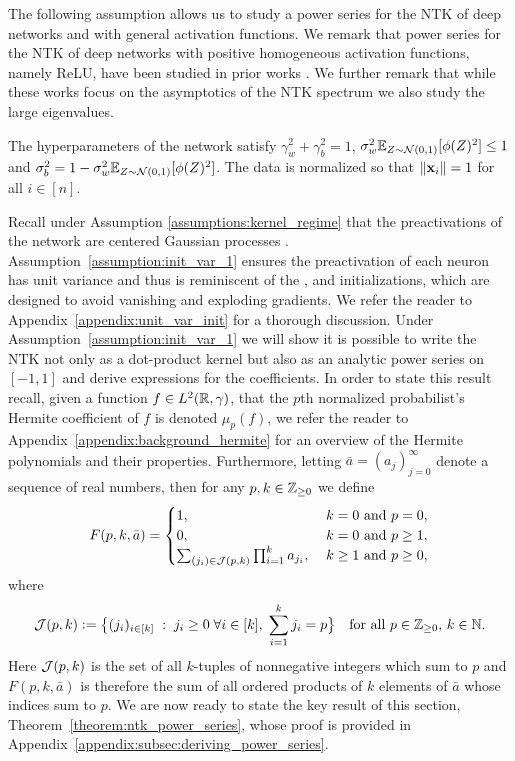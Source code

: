 The following assumption allows us to study a power series for the NTK of deep networks and with general activation functions. We remark that power series for the NTK of deep networks with positive homogeneous activation functions, namely ReLU, have been studied in prior works \cite{han2022fast, chen2021deep, bietti2021deep, geifman2022on}. We further remark that while these works focus on the asymptotics of the NTK spectrum we also study the large eigenvalues.
\begin{assumption} \label{assumption:init_var_1}
    The hyperparameters of the network satisfy $\gamma_w^2 + \gamma_b^2 = 1$, $\sigma_w^2 \mathbb{E}_{Z \sim \mathcal{N}(0,1)}[\phi(Z)^2] \leq 1$ and $\sigma_b^2 = 1 - \sigma_w^2\mathbb{E}_{Z \sim \mathcal{N}(0,1)} [\phi(Z)^2]$. The data is normalized so that $\left\lVert\mathbf x_i\right\rVert=1$ for all $i \in [n]$.
\end{assumption}
Recall under Assumption \ref{assumptions:kernel_regime} that the preactivations of the network are centered Gaussian processes \citep{neal1996, LeeBNSPS18}. 
 Assumption~\ref{assumption:init_var_1} ensures the preactivation of each neuron has unit variance and thus is reminiscent of the \cite{LeCuBottOrrMull9812}, \cite{pmlr-v9-glorot10a} and \cite{7410480} initializations, which are designed to avoid vanishing and exploding gradients. We refer the reader to Appendix~\ref{appendix:unit_var_init} for a thorough discussion. Under Assumption~\ref{assumption:init_var_1} we will show it is possible to write the NTK not only as a dot-product kernel but also as an analytic power series on $[-1,1]$ and derive expressions for the coefficients. In order to state this result recall, given a function $f \in L^2(\mathbb{R}, \gamma)$, that the $p$th normalized probabilist's Hermite coefficient of $f$ is denoted $\mu_p(f)$, we refer the reader to Appendix~\ref{appendix:background_hermite} for an overview of the Hermite polynomials and their properties. Furthermore, letting $\bar{a} = (a_j)_{j=0}^{\infty}$ denote a sequence of real numbers, then for any $p, k \in \mathbb{Z}_{\geq 0}$ we define
\begin{equation} \label{eq:def_F}
    F(p,k,\bar{a}) = 
    \begin{cases}
        1, \; &k=0 \text{ and } p = 0, \\
        0, \; &k=0 \text{ and } p \geq 1,\\
        \sum_{(j_i) \in \mathcal{J}(p,k)} \prod_{i=1}^k a_{j_i}, \; &k\geq 1 \text{ and } p \geq 0,
    \end{cases}
\end{equation}
where
\[
    \mathcal{J}(p,k) \vcentcolon= \big\{ (j_i)_{i \in [k]} \; : \; j_i \geq 0 \; \forall i \in [k], \; \sum_{i=1}^k j_i = p  \big\} \quad \text{for all $p \in \mathbb{Z}_{\geq 0}$, $k \in \mathbb{N}$}. 
\]
Here $\mathcal{J}(p,k)$ is the set of all $k$-tuples of nonnegative integers which sum to $p$ and $F(p,k,\bar{a})$ is therefore the sum of all ordered products of $k$ elements of $\bar{a}$ whose indices sum to $p$. We are now ready to state the key result of this section, Theorem~\ref{theorem:ntk_power_series}, whose proof is provided in Appendix~\ref{appendix:subsec:deriving_power_series}. 

